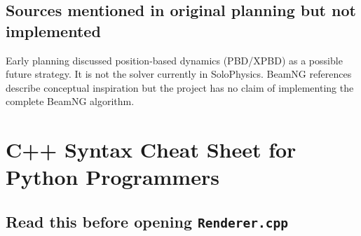 \documentclass[
  10pt,
  a4paper,
]{article}
\begin{document}
\subsection{Sources mentioned in original planning but not
implemented}\label{sources-mentioned-in-original-planning-but-not-implemented}

Early planning discussed position-based dynamics (PBD/XPBD) as a
possible future strategy. It is not the solver currently in SoloPhysics.
BeamNG references describe conceptual inspiration but the project has no
claim of implementing the complete BeamNG algorithm.

\newpage

\section{C++ Syntax Cheat Sheet for Python
Programmers}\label{c-syntax-cheat-sheet-for-python-programmers}

\subsection{\texorpdfstring{Read this before opening
\texttt{Renderer.cpp}}{Read this before opening Renderer.cpp}}\label{read-this-before-opening-renderer.cpp}
\end{document}
